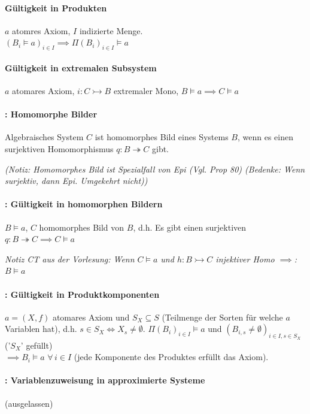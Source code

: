 \paragraph{ Gültigkeit in Produkten}
$a$ atomres Axiom, $I$ indizierte Menge. \\$(B_i \models a)_{i \in I} \implies \Pi(B_i)_{i \in I} \models a$


\paragraph{ Gültigkeit in extremalen Subsystem}
$a$ atomares Axiom, $i: C \rightarrowtail B$ extremaler Mono, $B \models a \implies C \models a$

\paragraph{: Homomorphe Bilder }
Algebraisches System $C$ ist homomorphes Bild eines Systems $B$, wenn es einen surjektiven Homomorphismus $q: B \twoheadrightarrow C$ gibt.

\emph{(Notiz: Homomorphes Bild ist Spezialfall von Epi (Vgl. Prop 80) (Bedenke: Wenn surjektiv, dann Epi. Umgekehrt nicht)) }


\paragraph{: Gültigkeit in homomorphen Bildern}
$B \models a$, $C$ homomorphes Bild von $B$, d.h. Es gibt einen surjektiven \homo $q: B \twoheadrightarrow C \implies C \models a$

\emph{Notiz CT aus der Vorlesung: Wenn $C \models a$ und $h: B \rightarrowtail C$ injektiver Homo $\implies$: $B \models a$}

\paragraph{: Gültigkeit in Produktkomponenten}
$a = (X,f)$ atomares Axiom und $S_X \subseteq S$ (Teilmenge der Sorten für welche $a$ Variablen hat), d.h. $s \in S_X \Leftrightarrow X_s \neq \emptyset$.
$\Pi (B_i)_{i \in I} \models a$ und $(B_{i,s} \neq \emptyset)_{i \in I, s \in S_X}$ ('$S_X$' gefüllt) \\
$\implies  B_i \models a \, \, \forall \,  i \in I $ (jede Komponente des Produktes erfüllt das Axiom).

\paragraph{: Variablenzuweisung in approximierte Systeme}
(ausgelassen)

